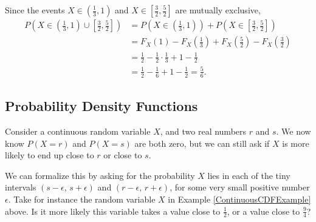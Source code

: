 \begin{example}
Since the events $X \in (\frac{1}{3}, 1)$ and $X \in [\frac{3}{2}, \frac{5}{2}]$ are mutually exclusive,
$$\begin{aligned}P(X \in (\textstyle\frac{1}{3}, 1) \cup [\frac{3}{2},\frac{5}{2}]) &= P(X \in (\textstyle\frac{1}{3}, 1)) + P(X \in [\frac{3}{2},\frac{5}{2}]) \\
&= F_X(1) - F_X(\textstyle\frac{1}{3}) + F_X( \frac{5}{2}) - F_X(\frac{3}{2}) \\
&= \textstyle\frac{1}{2} - \frac{1}{2}\cdot\frac{1}{3} + 1 - \frac{1}{2} \\
&= \textstyle\frac{1}{2} - \frac{1}{6} + 1 - \frac{1}{2} = \frac{5}{6}.\end{aligned}$$
\end{example}

\subsection*{Probability Density Functions}
Consider a continuous random variable $X$, and two real numbers $r$ and $s$. We now know $P(X = r)$ and $P(X = s)$ are both zero, but we can still ask if $X$ is more likely to end up close to $r$ or close to $s$. 

We can formalize this by asking for the probability $X$ lies in each of the tiny intervals $(s-\epsilon,\, s + \epsilon)$ and $(r-\epsilon, \,r+ \epsilon)$, for some very small positive number $\epsilon$. Take for instance the random variable $X$ in Example \ref{ContinuousCDFExample} above. Is it more likely this variable takes a value close to $\frac{1}{2}$, or a value close to $\frac{9}{4}$?

